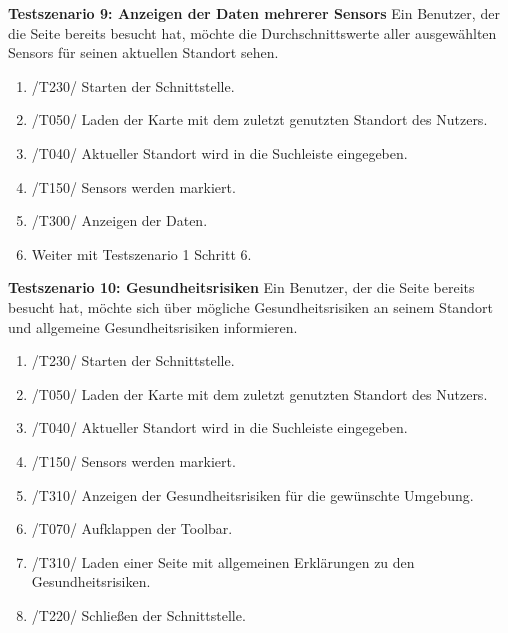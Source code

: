 \textbf{Testszenario 9: Anzeigen der Daten mehrerer \glspl{Sensor}}
\newline
Ein Benutzer, der die Seite bereits besucht hat, möchte die Durchschnittswerte aller ausgewählten \glspl{Sensor} für seinen aktuellen Standort sehen.
\begin{enumerate} [noitemsep]
    \item /T230/ Starten der Schnittstelle.
    \item /T050/ Laden der Karte mit dem zuletzt genutzten Standort des Nutzers.
    \item /T040/ Aktueller Standort wird in die Suchleiste eingegeben.
    \item /T150/ \glspl{Sensor} werden markiert.
    \item /T300/ Anzeigen der  Daten.
    \item Weiter mit Testszenario 1 Schritt 6.
\end{enumerate}

\textbf{Testszenario 10: Gesundheitsrisiken}
\newline
Ein Benutzer, der die Seite bereits besucht hat, möchte sich über mögliche Gesundheitsrisiken an seinem Standort und allgemeine Gesundheitsrisiken informieren.
\begin{enumerate} [noitemsep]
    \item /T230/ Starten der Schnittstelle.
    \item /T050/ Laden der Karte mit dem zuletzt genutzten Standort des Nutzers.
    \item /T040/ Aktueller Standort wird in die Suchleiste eingegeben.
    \item /T150/ \glspl{Sensor} werden markiert.
    \item /T310/ Anzeigen der Gesundheitsrisiken für die gewünschte Umgebung.
    \item /T070/ Aufklappen der \gls{Toolbar}.
    \item /T310/ Laden einer Seite mit allgemeinen Erklärungen zu den Gesundheitsrisiken.
    \item /T220/ Schließen der Schnittstelle.
\end{enumerate}

